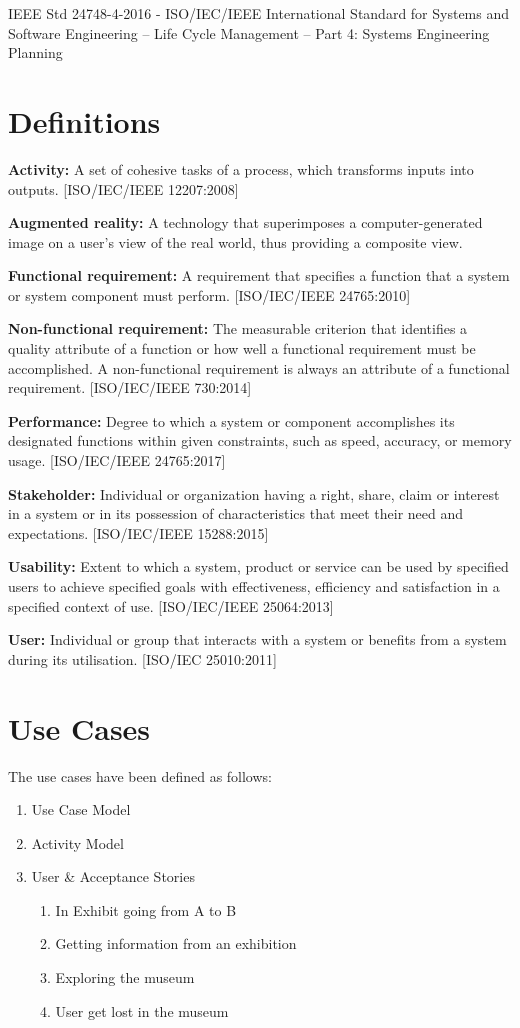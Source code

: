 IEEE Std 24748-4-2016 - ISO/IEC/IEEE International Standard for Systems and Software Engineering -- Life Cycle Management -- Part 4: Systems Engineering Planning \cite{IEEE24748}

\section*{Definitions}
\textbf{Activity:} A set of cohesive tasks of a process, which transforms inputs into outputs. [ISO/IEC/IEEE 12207:2008]

\textbf{Augmented reality:} A technology that superimposes a computer-generated image on a user's view of the real world, thus providing a composite view.

\textbf{Functional requirement:} A requirement that specifies a function that a system or system component must perform. [ISO/IEC/IEEE 24765:2010]

\textbf{Non-functional requirement:} The measurable criterion that identifies a quality attribute of a function or how well a functional requirement must be accomplished. A non-functional requirement is always an attribute of a functional requirement. [ISO/IEC/IEEE 730:2014]

\textbf{Performance:} Degree to which a system or component accomplishes its designated functions within given constraints, such as speed, accuracy, or memory usage. [ISO/IEC/IEEE 24765:2017]

\textbf{Stakeholder:} Individual or organization having a right, share, claim or interest in a system or in its possession of characteristics that meet their need and expectations. [ISO/IEC/IEEE 15288:2015]

\textbf{Usability:} Extent to which a system, product or service can be used by specified users to achieve specified goals with effectiveness, efficiency and satisfaction in a specified context of use. [ISO/IEC/IEEE 25064:2013]

\textbf{User:} Individual or group that interacts with a system or benefits from a system during its utilisation. [ISO/IEC 25010:2011]

\section*{Use Cases}
The use cases have been defined as follows:
\begin{enumerate}
    \item Use Case Model
    \item Activity Model
    \item User \& Acceptance Stories
    \begin{enumerate}
        \item In Exhibit going from A to B
        \item Getting information from an exhibition
        \item Exploring the museum
        \item User get lost in the museum
    \end{enumerate}
\end{enumerate}

